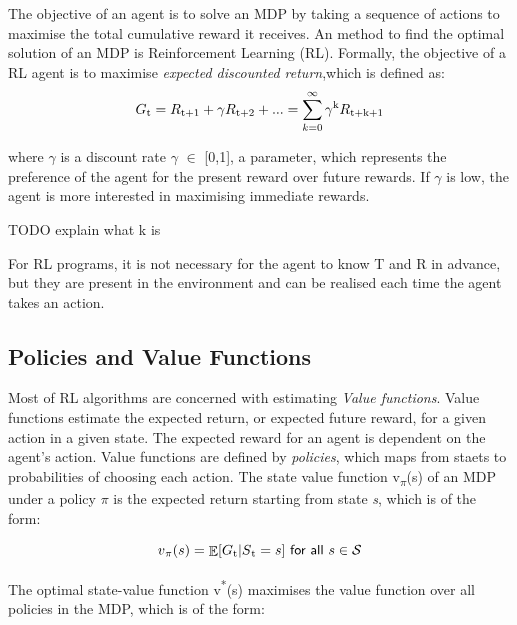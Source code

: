 \documentclass[12pt,twoside]{report}
\theoremstyle{plain}
\theoremstyle{definition}
\DeclareMathOperator{\E}{\mathbb{E}}
\begin{document}

The objective of an agent is to solve an MDP by taking a sequence of actions to maximise the total cumulative reward it receives. 
An method to find the optimal solution of an MDP is Reinforcement Learning (RL). 
Formally, the objective of a RL agent is to maximise \textit{expected discounted return},which is defined as:
\begin{equation}
\begin{split}
G\textsubscript{t} = R\textsubscript{t+1} + \gamma R \textsubscript{t+2} + ...  = \sum_{k=0}^{\infty} \gamma\textsuperscript{k} R\textsubscript{t+k+1} 
\end{split}
\end{equation}

where $\gamma$ is a discount rate $\gamma$ $\in$ [0,1], a parameter,  which represents the preference of the agent for the present reward over future rewards. If $\gamma$ is low, the agent is more interested in maximising immediate rewards. 

TODO explain what k is 

For RL programs, it is not necessary for the agent to know T and R in advance, but they are present in the environment and can be realised each time the agent takes an action. 

\subsection{Policies and Value Functions}
\label{policy_value_functions_subsection}
Most of RL algorithms are concerned with estimating \textit{Value functions}.
Value functions estimate the expected return, or expected future reward,  for a given action in a given state. The expected reward for an agent is dependent on the agent's action.  Value functions are defined by \textit{policies}, which maps from staets to probabilities of choosing each action. The state value function v\textsubscript{$\pi$}(s) of an MDP under a policy $\pi$ is the expected return starting from state \textit{s}, which is of the form:

\begin{equation}
v\textsubscript{$\pi$}(s) = \displaystyle \E [G\textsubscript{t} \vert S\textsubscript{t} = s] \ \textsf{for all}\ s \in \mathcal{S}
\end{equation}

The optimal state-value function v\textsuperscript{*}(s) maximises the value function over all policies in the MDP, which is of the form:
\end{document}
